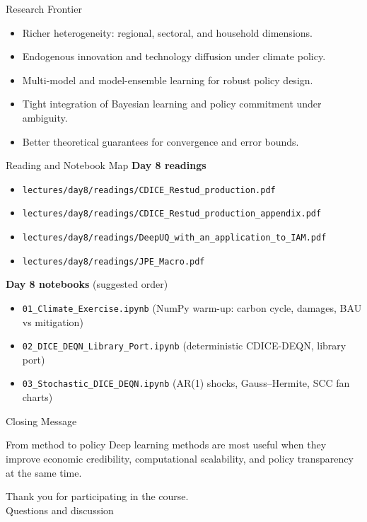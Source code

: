 \documentclass[aspectratio=169,11pt]{beamer}
\newcommand{\emphc}[1]{\textcolor{harvardcrimson}{#1}}
\begin{document}
\begin{frame}{Research Frontier}
\begin{itemize}
    \item Richer heterogeneity: regional, sectoral, and household dimensions.
    \item Endogenous innovation and technology diffusion under climate policy.
    \item Multi-model and model-ensemble learning for robust policy design.
    \item Tight integration of Bayesian learning and policy commitment under ambiguity.
    \item Better theoretical guarantees for convergence and error bounds.
\end{itemize}
\end{frame}

\begin{frame}{Reading and Notebook Map}
\small
\textbf{Day 8 readings}
\begin{itemize}
    \item \texttt{lectures/day8/readings/CDICE\_Restud\_production.pdf}
    \item \texttt{lectures/day8/readings/CDICE\_Restud\_production\_appendix.pdf}
    \item \texttt{lectures/day8/readings/DeepUQ\_with\_an\_application\_to\_IAM.pdf}
    \item \texttt{lectures/day8/readings/JPE\_Macro.pdf}
\end{itemize}

\vspace{0.2cm}
\textbf{Day 8 notebooks} (suggested order)
\begin{itemize}
    \item \texttt{01\_Climate\_Exercise.ipynb} \hfill (NumPy warm-up: carbon cycle, damages, BAU vs mitigation)
    \item \texttt{02\_DICE\_DEQN\_Library\_Port.ipynb} \hfill (deterministic CDICE-DEQN, library port)
    \item \texttt{03\_Stochastic\_DICE\_DEQN.ipynb} \hfill (AR(1) shocks, Gauss--Hermite, SCC fan charts)
\end{itemize}
\end{frame}

\begin{frame}{Closing Message}
\begin{block}{From method to policy}
Deep learning methods are most useful when they improve \emphc{economic credibility},
\emphc{computational scalability}, and \emphc{policy transparency} at the same time.
\end{block}

\vspace{0.5cm}
\begin{center}
{\Large Thank you for participating in the course.}\\[6pt]
{\LARGE \emphc{Questions and discussion}}
\end{center}
\end{frame}
\end{document}

